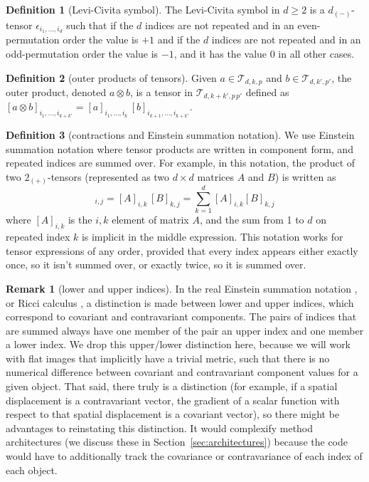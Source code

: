 \documentclass{article}
\theoremstyle{definition}
\newtheorem{definition}{Definition}
\newtheorem*{remark}{Remark}
\newcommand{\tensorname}[2]{{#1}_{(#2)}}
\newcommand{\tensor}[2]{$\tensorname{#1}{#2}$-tensor}
\newcommand{\sectionname}{Section}
\newcommand{\secref}[1]{\sectionname~\ref{#1}}
\begin{document}
\begin{definition}[Levi-Civita symbol]\label{def:levicivita}
The Levi-Civita symbol in $d\geq 2$ is a \tensor{d}{-} $\epsilon_{i_1,\ldots, i_d}$ such that if the $d$ indices are not repeated and in an even-permutation order the value is $+1$ and if the $d$ indices are not repeated and in an odd-permutation order the value is $-1$, and it has the value $0$ in all other cases.
\end{definition}

\begin{definition}[outer products of tensors]
Given $a \in \mathcal{T}_{d,k,p}$ and $b \in \mathcal{T}_{d,k',p'}$, the outer product, denoted $a\otimes b$, is a tensor in $\mathcal{T}_{d,k+k',p\,p'}$ defined as $[a\otimes b]_{i_1,\ldots,i_{k+k'}} = [a]_{i_1,\ldots,i_k}\,[b]_{i_{k+1},\ldots,i_{k+k'}}$.
\end{definition}

\begin{definition}[contractions and Einstein summation notation]\label{def:contraction}
We use Einstein summation notation where tensor products are written in component form, and repeated indices are summed over.
For example, in this notation, the product of two \tensor{2}{+}s (represented as two $d\times d$ matrices $A$ and $B$) is written as
\begin{equation}
    [A\, B]_{i,j} = [A]_{i,k}\,[B]_{k,j} = \sum_{k=1}^d [A]_{i,k}[B]_{k,j}
\end{equation}
where $[A]_{i,k}$ is the $i,k$ element of matrix $A$, and the sum from 1 to $d$ on repeated index $k$ is implicit in the middle expression.
This notation works for tensor expressions of any order, provided that every index appears either exactly once, so it isn't summed over, or exactly twice, so it is summed over.
\end{definition}

\begin{remark}[lower and upper indices]
In the real Einstein summation notation \cite{einstein}, or Ricci calculus \cite{ricci}, a distinction is made between lower and upper indices, which correspond to covariant and contravariant components.
The pairs of indices that are summed always have one member of the pair an upper index and one member a lower index.
We drop this upper/lower distinction here, because we will work with flat images that implicitly have a trivial metric, such that there is no numerical difference between covariant and contravariant component values for a given object.
That said, there truly is a distinction (for example, if a spatial displacement is a contravariant vector, the gradient of a scalar function with respect to that spatial displacement is a covariant vector), so there might be advantages to reinstating this distinction.
It would complexify method architectures (we discuss these in \secref{sec:architectures}) because the code would have to additionally track the covariance or contravariance of each index of each object.
\end{remark}
\end{document}
